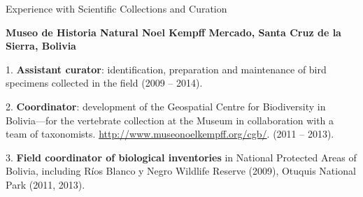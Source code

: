 \documentclass{resume} %
\begin{document}
\begin{rSection}{Experience with Scientific Collections and Curation}

\normalfont

\textbf{Museo de Historia Natural Noel Kempff Mercado, Santa Cruz de la Sierra, Bolivia} \smallskip 
\item 1.	\textbf{Assistant curator}: identification, preparation and maintenance of bird specimens collected in the field (2009 – 2014). 
\item 2.	\textbf{Coordinator}: development of the Geospatial Centre for Biodiversity in Bolivia—for the vertebrate collection at the Museum in collaboration with a team of taxonomists. \url{http://www.museonoelkempff.org/cgb/}. (2011 – 2013). 
\item 3.	\textbf{Field coordinator of biological inventories} in National Protected Areas of Bolivia, including Ríos Blanco y Negro Wildlife Reserve (2009), Otuquis National Park (2011, 2013).

\end{rSection}

\end{document}
